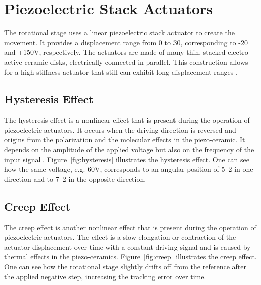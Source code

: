 \section{Piezoelectric Stack Actuators}
The rotational stage uses a linear piezoelectric stack actuator to create the movement. It provides a displacement range from 0 to \unit{30}{\micro\meter}, corresponding to -20 and +150V, respectively. The actuators are made of many thin, stacked electro-active ceramic disks, electrically connected in parallel. This construction allows for a high stiffness actuator that still can exhibit long displacement ranges \citep{Piezo:2008}.

\subsection{Hysteresis Effect}
The hysteresis effect is a nonlinear effect that is present during the operation of piezoelectric actuators. It occurs when the driving direction is reversed and origins from the polarization and the molecular effects in the piezo-ceramic. It depends on the amplitude of the applied voltage but also on the frequency of the input signal \citep{Qingson:2016}. Figure~\ref{fig:hysteresis} illustrates the hysteresis effect. One can see how the same voltage, e.g. 60V, corresponds to an angular position of \unit{5.2}{\micro\rad} in one direction and to \unit{7.2}{\micro\rad} in the opposite direction.

\subsection{Creep Effect}
The creep effect is another nonlinear effect that is present during the operation of piezoelectric actuators. The effect is a slow elongation or contraction of the actuator displacement over time with a constant driving signal and is caused by thermal effects in the piezo-ceramics. Figure~\ref{fig:creep} illustrates the creep effect. One can see how the rotational stage slightly drifts off from the reference after the applied negative step, increasing the tracking error over time.

